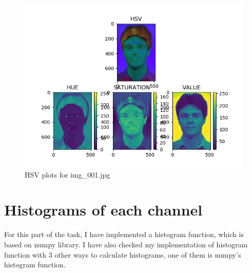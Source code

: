 \documentclass[11pt]{report}
\begin{document}
\begin{figure}
    \centering
    \includegraphics[height=0.4\textheight]{Task 1 Plots/HSV_plots.png}
    \caption{HSV plots for img\_001.jpg}
    \label{fig:hsv_all}
\end{figure}

\newpage

\section{Histograms of each channel}

For this part of the task, I have implemented a histogram function, which is based on numpy library. I have also checked my implementation of histogram function with 3 other ways to calculate histograms, one of them is numpy's histogram function.
\end{document}
